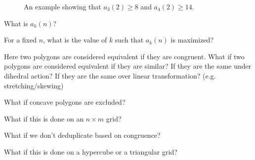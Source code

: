 \documentclass{article}
\begin{document}
\begin{figure}[!h]
\begin{tikzpicture}
    \end{tikzpicture}
    \caption{
      An example showing that $a_3(2) \geq 8$ and $a_4(2) \geq 14$.
    }
  \end{figure}
\begin{question}
  What is $a_k(n)$?
\end{question}
\begin{related}
  \item For a fixed $n$, what is the value of $k$ such that $a_k(n)$ is
    maximized?
  \item Here two polygons are considered equivalent if they are congruent. What
  if two polygons are considered equivalent if they are similar?
  If they are the same under dihedral action?
  If they are the same over linear transformation? (e.g. stretching/skewing)
  \item What if concave polygons are excluded?
  \item What if this is done on an $n \times m$ grid?
  \item What if we don't deduplicate based on congruence?
  \item What if this is done on a hypercube or a triangular grid?
\end{related}
\end{document}
